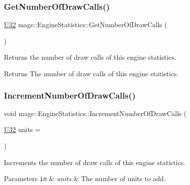 \subsubsection{\texorpdfstring{Get\+Number\+Of\+Draw\+Calls()}{GetNumberOfDrawCalls()}}
{\footnotesize\ttfamily \hyperlink{namespacemage_a41c104c036fba3756a74e19f793eeaa1}{U32} mage\+::\+Engine\+Statistics\+::\+Get\+Number\+Of\+Draw\+Calls (\begin{DoxyParamCaption}{ }\end{DoxyParamCaption})\hspace{0.3cm}{\ttfamily [noexcept]}}

Returns the number of draw calls of this engine statistics.

\begin{DoxyReturn}{Returns}
The number of draw calls of this engine statistics. 
\end{DoxyReturn}
\hypertarget{classmage_1_1_engine_statistics_af26859407a4780e9471131fcfbe3a125}{}\label{classmage_1_1_engine_statistics_af26859407a4780e9471131fcfbe3a125} 
\subsubsection{\texorpdfstring{Increment\+Number\+Of\+Draw\+Calls()}{IncrementNumberOfDrawCalls()}}
{\footnotesize\ttfamily void mage\+::\+Engine\+Statistics\+::\+Increment\+Number\+Of\+Draw\+Calls (\begin{DoxyParamCaption}\item[{\hyperlink{namespacemage_a41c104c036fba3756a74e19f793eeaa1}{U32}}]{units = {} }\end{DoxyParamCaption})\hspace{0.3cm}{\ttfamily [noexcept]}}

Increments the number of draw calls of this engine statistics.


\begin{DoxyParams}[1]{Parameters}
\mbox{\tt in}  & {\em units} & The number of units to add. \\
\hline
\end{DoxyParams}
\hypertarget{classmage_1_1_engine_statistics_a6c5e8b9a5806e67f6f93a3c558293249}{}\label{classmage_1_1_engine_statistics_a6c5e8b9a5806e67f6f93a3c558293249} 
